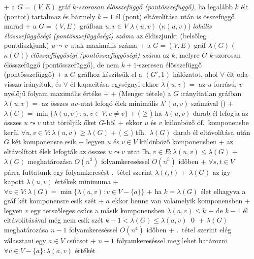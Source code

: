 + \dfn a $G = (V, E)$ gráf \emph{$k$-szorosan élösszefüggő
  (pontösszefüggő)}, ha legalább $k$ élt (pontot) tartalmaz és bármely
  $k - 1$ él (pont) eltávolítása után is összefüggő marad
+ \dfn a $G = (V, E)$ gráfban $u, v \in V$ $\lambda(u, v)$ ($\kappa(u,
  v)$) \emph{lokális élösszefüggőségi (pontösszefüggőségi) szám}a az
  éldiszjunkt (belsőleg pontdiszkjunk) $u \leadsto v$
  utak maximális száma
+ \dfn a $G = (V, E)$ gráf $\lambda(G)$ ($\kappa(G)$)
  \emph{élösszefüggőségi (pontösszefüggőségi)
  szám}a az $k$, melyre $G$ $k$-szorosan élösszefüggő
  (pontösszefüggő), de nem $k + 1$-szeresen élösszefüggő
  (pontösszefüggő)
+ \thm \label{thm:halozat:menger:folyam}a $G$ gráfhoz készítsük el a
  $(G', 1)$ hálózatot, ahol $\forall$ élt
  oda-vissza irányítuk, és $\forall$ él kapacitása egységnyi \RA ekkor
  $\lambda(u, v) =$ az $u$ forrású, $v$ nyelőjű folyam maximális
  értéke
  + \noproof
+ \thm (Menger tétele) a $G$ irányítatlan gráfban $\lambda(u, v) =$ az
  összes $uv$-utat lefogó élek minimális $\lambda'(u, v)$ számával
  (\noproof)
+ \thm $\lambda(G) = \min \{ \lambda(u, v) : u, v \in V, e \ne v \}$
  + \proof ($\ge$) ha $\lambda(u, v)$ darab él lefogja az összes $u
  \leadsto v$ utat \RA töröljük őket $G$-ből
    + ekkor $u$ és $v$ különböző öf.~komponensbe
      kerül \RA $\forall u, v \in V : \lambda(u, v) \ge \lambda(G)$
  + ($\le$) tfh.~$\lambda(G)$ darab él eltávolítása után $G$ két
    komponensre esik
    + legyen $u$ és $v \in V$ különböző komponensben
    + az eltávolított élek lefogták az összes $u \leadsto v$ utat \RA%
      $\exists u, v \in E : \lambda(u, v) \le \lambda(G)$
+ \alg $\lambda(G)$ meghatározása $O(n^2)$ folyamkereséssel $O(n^5)$
  időben
  + $\forall s, t \in V$ párra futtatunk egy folyamkeresést
    .~tétel szerint \RA $\lambda(t,
    t)$
  + $\lambda(G)$ az így kapott $\lambda(u, v)$ értékek minimuma
+ \thm \label{thm:halozat:menger:linearis}$\forall a \in V :
\lambda(G) = \min \{ \lambda(a, v) : v \in V - \{a\}\}$
  + \proof ha $k = \lambda(G)$ élet elhagyva a gráf két komponensre esik szét
    + $a$ ekkor benne van valamelyik komponensben
    + legyen $v$ egy tetszőleges csúcs a másik komponensben \RA
      $\lambda(a, v) \le k$
    + de $k - 1$ él eltávolításával még nem esik szét \RA $k -
    1 < \lambda(G) \le \lambda(a, v)$ \qed
+ \alg $\lambda(G)$ meghatározása $n - 1$ folyamkereséssel $O(n^4)$
  időben
  + .~tétel szerint elég választani
    egy $a \in V$ csúcsot
  + $n - 1$ folyamkereséssel meg lehet határozni $\forall v \in V - \{a\} :
    \lambda(a, v)$ értékét

